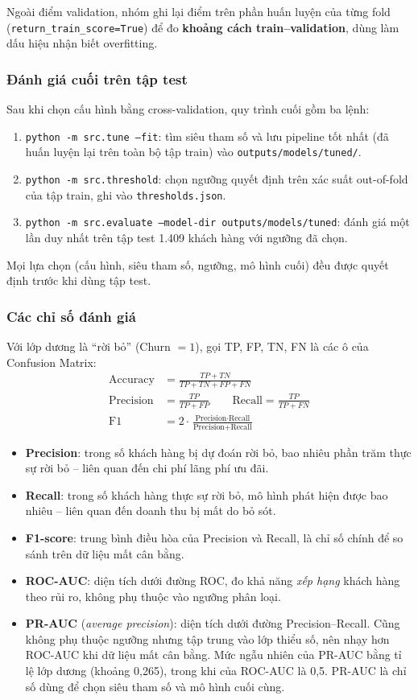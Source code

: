 Ngoài điểm validation, nhóm ghi lại điểm trên phần huấn luyện của từng fold (\texttt{return\_train\_score=True}) để đo \textbf{khoảng cách train--validation}, dùng làm dấu hiệu nhận biết overfitting.

\subsubsection{Đánh giá cuối trên tập test}
Sau khi chọn cấu hình bằng cross-validation, quy trình cuối gồm ba lệnh:
\begin{enumerate}
    \item \texttt{python -m src.tune --fit}: tìm siêu tham số và lưu pipeline tốt nhất (đã huấn luyện lại trên toàn bộ tập train) vào \texttt{outputs/models/tuned/}.
    \item \texttt{python -m src.threshold}: chọn ngưỡng quyết định trên xác suất out-of-fold của tập train, ghi vào \texttt{thresholds.json}.
    \item \texttt{python -m src.evaluate --model-dir outputs/models/tuned}: đánh giá một lần duy nhất trên tập test 1.409 khách hàng với ngưỡng đã chọn.
\end{enumerate}
Mọi lựa chọn (cấu hình, siêu tham số, ngưỡng, mô hình cuối) đều được quyết định trước khi dùng tập test.

\subsubsection{Các chỉ số đánh giá}
Với lớp dương là ``rời bỏ'' (Churn $=1$), gọi TP, FP, TN, FN là các ô của Confusion Matrix:
\begin{align}
    \text{Accuracy}  &= \frac{TP + TN}{TP + TN + FP + FN} \\
    \text{Precision} &= \frac{TP}{TP + FP} \qquad
    \text{Recall} = \frac{TP}{TP + FN} \\
    \text{F1}        &= 2 \cdot \frac{\text{Precision} \cdot \text{Recall}}{\text{Precision} + \text{Recall}}
\end{align}
\begin{itemize}
    \item \textbf{Precision}: trong số khách hàng bị dự đoán rời bỏ, bao nhiêu phần trăm thực sự rời bỏ -- liên quan đến chi phí lãng phí ưu đãi.
    \item \textbf{Recall}: trong số khách hàng thực sự rời bỏ, mô hình phát hiện được bao nhiêu -- liên quan đến doanh thu bị mất do bỏ sót.
    \item \textbf{F1-score}: trung bình điều hòa của Precision và Recall, là chỉ số chính để so sánh trên dữ liệu mất cân bằng.
    \item \textbf{ROC-AUC}: diện tích dưới đường ROC, đo khả năng \textit{xếp hạng} khách hàng theo rủi ro, không phụ thuộc vào ngưỡng phân loại.
    \item \textbf{PR-AUC} (\textit{average precision}): diện tích dưới đường Precision--Recall. Cũng không phụ thuộc ngưỡng nhưng tập trung vào lớp thiểu số, nên nhạy hơn ROC-AUC khi dữ liệu mất cân bằng. Mức ngẫu nhiên của PR-AUC bằng tỉ lệ lớp dương (khoảng 0,265), trong khi của ROC-AUC là 0,5. PR-AUC là chỉ số dùng để chọn siêu tham số và mô hình cuối cùng.
\end{itemize}

